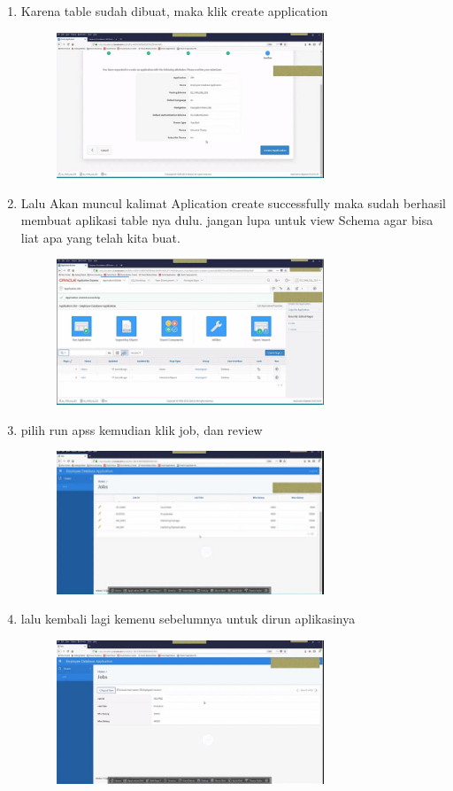 \documentclass{article}
\begin{document}
\begin{enumerate}
\begin{figure}[h]
            \end{figure}
\item  Karena  table sudah  dibuat, maka klik create application
\begin{figure}[h]
\centerline{\includegraphics[width=8cm]{figure/L.png}}
            \end{figure}
\newpage\item   Lalu Akan muncul kalimat Aplication create successfully maka sudah berhasil membuat aplikasi table nya dulu.
jangan lupa untuk view Schema agar bisa liat apa yang telah kita buat.
\begin{figure}[h]
\centerline{\includegraphics[width=8cm]{figure/M.png}}
            \end{figure}
\item  pilih run apss kemudian klik job, dan review
\begin{figure}[h]
\centerline{\includegraphics[width=8cm]{figure/N.png}}
            \end{figure}
\item  lalu kembali lagi kemenu sebelumnya untuk dirun aplikasinya
\begin{figure}[h]
\centerline{\includegraphics[width=8cm]{figure/O.png}}
            \end{figure}


\end{enumerate}
\end{document}
